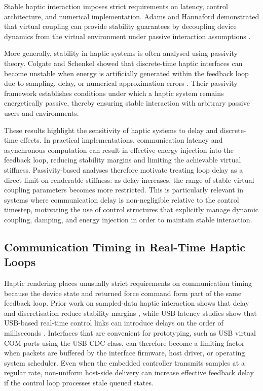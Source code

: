 Stable haptic interaction imposes strict requirements on latency, control architecture, and numerical implementation. Adams and Hannaford demonstrated that virtual coupling can provide stability guarantees by decoupling device dynamics from the virtual environment under passive interaction assumptions \cite{adamsStableHapticInteraction1999}. 

More generally, stability in haptic systems is often analysed using passivity theory. Colgate and Schenkel showed that discrete-time haptic interfaces can become unstable when energy is artificially generated within the feedback loop due to sampling, delay, or numerical approximation errors \cite{colgatePassivityClassSampleddata1997}. Their passivity framework establishes conditions under which a haptic system remains energetically passive, thereby ensuring stable interaction with arbitrary passive users and environments.

These results highlight the sensitivity of haptic systems to delay and discrete-time effects. In practical implementations, communication latency and asynchronous computation can result in effective energy injection into the feedback loop, reducing stability margins and limiting the achievable virtual stiffness. Passivity-based analyses therefore motivate treating loop delay as a direct limit on renderable stiffness: as delay increases, the range of stable virtual coupling parameters becomes more restricted. This is particularly relevant in systems where communication delay is non-negligible relative to the control timestep, motivating the use of control structures that explicitly manage dynamic coupling, damping, and energy injection in order to maintain stable interaction.

\subsection{Communication Timing in Real-Time Haptic Loops}

Haptic rendering places unusually strict requirements on communication timing because the device state and returned force command form part of the same feedback loop. Prior work on sampled-data haptic interaction shows that delay and discretisation reduce stability margins \cite{colgatePassivityClassSampleddata1997,adamsStableHapticInteraction1999}, while USB latency studies show that USB-based real-time control links can introduce delays on the order of milliseconds \cite{ramadossStudyUniversalSerial2008}. Interfaces that are convenient for prototyping, such as USB virtual COM ports using the USB CDC class, can therefore become a limiting factor when packets are buffered by the interface firmware, host driver, or operating system scheduler. Even when the embedded controller transmits samples at a regular rate, non-uniform host-side delivery can increase effective feedback delay if the control loop processes stale queued states.

